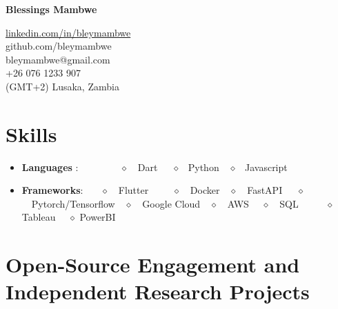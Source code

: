 \documentclass[a4paper,11pt]{article}
\makeatletter
\newcommand{\resumeItem}[2]{
  \item\small{
    \textbf{#1}{: #2 \vspace{-2pt}}
  }
}
\newcommand{\resumeSubItem}[2]{\resumeItem{#1}{#2}\vspace{-4pt}}
\newcommand{\resumeSubHeadingListStart}{\begin{itemize}[leftmargin=*]}
\newcommand{\resumeSubHeadingListEnd}{\end{itemize}}
\newcommand{\mytitle}{\textbf{{\huge {Blessings Mambwe}}}}
\newcommand{\intro}{
Inquisitive and self-motivated machine learning researcher looking to attend a master's program with funding or work in a lab where I can use my skills in mechanics and linear algebra to build physics informed machine learning models.}}
\newcommand{\email}{%
\href{mailto:bleymambwe@gmail.com}{\scriptsize{\faEnvelope{}}} bleymambwe@gmail.com}
\newcommand{\linkedin}{
\href{https://linkedin.com/in/bleymambwe/} {linkedin.com/in/bleymambwe}}
\newcommand{\gitlab}{
\href{https://gitlab.com/bleymambwe}{\faGitlab{}} gitlab.com/bleymambwe}
\newcommand{\github}{
\href{https://github.com/bleymambwe}{\faGithub{}} github.com/bleymambwe}
\newcommand{\portfolio}{\href{https://www.dropbox.com/sh/p7llir6jzn9ey2e/AAA5wInAs7B0Ttw2MomihMpda?dl=0}\faFolderOpen Portfolio : {https://cutt.ly/FKrfhQ6} }
\newcommand{\addressBR}{%
\hspace{1pt}\faMapMarker{}\hspace{1pt}(GMT+2) Lusaka, Zambia}
\newcommand{\phoneBR}{%
\href{tel:+260761233907}{\faWhatsapp{}} +26 076 1233 907}%
\makeatother
\begin{document}
%


\vspace{-10pt}
\begin{minipage}{0.73\linewidth}%
    {\centering
        \mytitle{}\par
    }
    \vspace{6pt}
    
\end{minipage}
\hspace{6pt}
\begin{minipage}{0.243\linewidth}
    {\flushleft
        \vspace{25pt}
        \small{
        \linkedin{}\\
        \github{}\\
         \email{}\\
         \phoneBR{}\\
        \addressBR{}\\
        }
    }
\end{minipage}

\vspace{-5pt}

\section{Skills}
 \resumeSubHeadingListStart
 \resumeSubItem{Languages \faCode }{~~~~~~~~$\diamond$~~Dart~~~$\diamond$ ~Python~~$\diamond$ ~Javascript~~  }
 
\resumeSubItem{Frameworks}{~~~$\diamond$~~Flutter~~~~~$\diamond$~~Docker~~$\diamond$~~FastAPI~~~$\diamond$~~Pytorch/Tensorflow~~$\diamond$~~Google Cloud~~$\diamond$~~AWS ~~$\diamond$~~SQL~~~~~ $\diamond$ Tableau ~~$\diamond$ PowerBI  }

\resumeSubHeadingListEnd


\section{Open-Source Engagement and Independent Research Projects}
\end{document}
